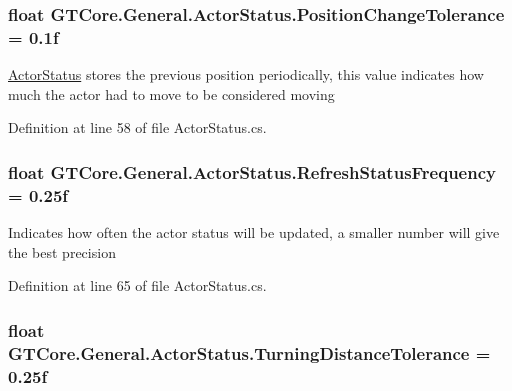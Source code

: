 \subsubsection[{Position\+Change\+Tolerance}]{\setlength{\rightskip}{0pt plus 5cm}float G\+T\+Core.\+General.\+Actor\+Status.\+Position\+Change\+Tolerance = 0.\+1f}\label{class_g_t_core_1_1_general_1_1_actor_status_a0a365c9c2ca1a5b136caac5d2ffd68a9}


\hyperlink{class_g_t_core_1_1_general_1_1_actor_status}{Actor\+Status} stores the previous position periodically, this value indicates how much the actor had to move to be considered \textquotesingle{}moving\textquotesingle{} 



Definition at line 58 of file Actor\+Status.\+cs.

\hypertarget{class_g_t_core_1_1_general_1_1_actor_status_a09cf9b4d30d9694ac391b5cb692ec1da}{}
\subsubsection[{Refresh\+Status\+Frequency}]{\setlength{\rightskip}{0pt plus 5cm}float G\+T\+Core.\+General.\+Actor\+Status.\+Refresh\+Status\+Frequency = 0.\+25f}\label{class_g_t_core_1_1_general_1_1_actor_status_a09cf9b4d30d9694ac391b5cb692ec1da}


Indicates how often the actor status will be updated, a smaller number will give the best precision 



Definition at line 65 of file Actor\+Status.\+cs.

\hypertarget{class_g_t_core_1_1_general_1_1_actor_status_a38ef3887ee64950042929e342f00d015}{}
\subsubsection[{Turning\+Distance\+Tolerance}]{\setlength{\rightskip}{0pt plus 5cm}float G\+T\+Core.\+General.\+Actor\+Status.\+Turning\+Distance\+Tolerance = 0.\+25f}\label{class_g_t_core_1_1_general_1_1_actor_status_a38ef3887ee64950042929e342f00d015}


